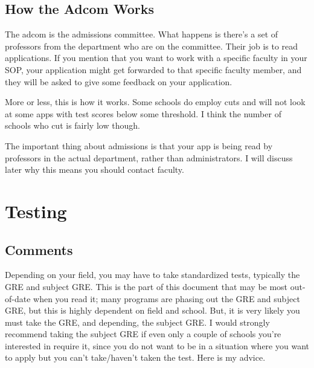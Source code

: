 \documentclass[12pt]{article}
\begin{document}
\subsection{How the Adcom Works}
The adcom is the admissions committee. What happens is there's a set of professors from the department who are on the committee. Their job is to read applications. If you mention that you want to work with a specific faculty in your SOP, your application might get forwarded to that specific faculty member, and they will be asked to give some feedback on your application.

More or less, this is how it works. Some schools do employ cuts and will not look at some apps with test scores below some threshold. I think the number of schools who cut is fairly low though. 

The important thing about admissions is that your app is being read by professors in the actual department, rather than administrators. I will discuss later why this means you should contact faculty.

\section{Testing}
\subsection{Comments}
Depending on your field, you may have to take standardized tests, typically the GRE and subject GRE. This is the part of this document that may be most out-of-date when you read it; many programs are phasing out the GRE and subject GRE, but this is highly dependent on field and school. But, it is very likely you must take the GRE, and depending, the subject GRE. I would strongly recommend taking the subject GRE if even only a couple of schools you're interested in require it, since you do not want to be in a situation where you want to apply but you can't take/haven't taken the test. Here is my advice.
\end{document}
